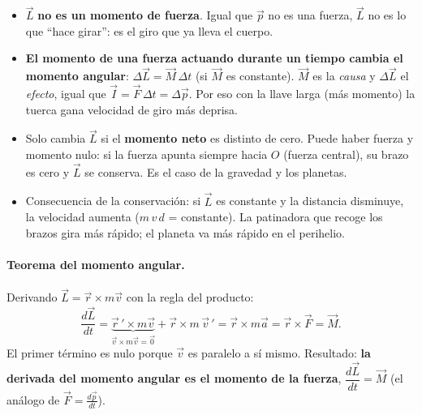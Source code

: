 \documentclass[11pt,a4paper]{article}
\begin{document}
\begin{clave}[title={Interpretación del momento angular (en paralelo con el momento lineal)}]
\begin{center}
\end{center}
\begin{itemize}[itemsep=2pt]
  \item $\vec L$ \textbf{no es un momento de fuerza}. Igual que $\vec p$ no es una fuerza, $\vec L$ no es lo que ``hace girar'': es el giro que ya lleva el cuerpo.
  \item \textbf{El momento de una fuerza actuando durante un tiempo cambia el momento angular}: $\Delta\vec L=\vec M\,\Delta t$ (si $\vec M$ es constante). $\vec M$ es la \emph{causa} y $\Delta\vec L$ el \emph{efecto}, igual que $\vec I=\vec F\,\Delta t=\Delta\vec p$. Por eso con la llave larga (más momento) la tuerca gana velocidad de giro más deprisa.
  \item Solo cambia $\vec L$ si el \textbf{momento neto} es distinto de cero. Puede haber fuerza y momento nulo: si la fuerza apunta siempre hacia $O$ (fuerza central), su brazo es cero y $\vec L$ se conserva. Es el caso de la gravedad y los planetas.
  \item Consecuencia de la conservación: si $\vec L$ es constante y la distancia disminuye, la velocidad aumenta ($m\,v\,d$ = constante). La patinadora que recoge los brazos gira más rápido; el planeta va más rápido en el perihelio.
\end{itemize}
\end{clave}

\paragraph{Teorema del momento angular.} Derivando $\vec L=\vec r\times m\vec v$ con la regla del producto:
\[
\frac{d\vec L}{dt}=\underbrace{\vec r\,'\times m\vec v}_{\vec v\times m\vec v=\vec 0}+\vec r\times m\,\vec v\,'=\vec r\times m\vec a=\vec r\times\vec F=\vec M .
\]
El primer término es nulo porque $\vec v$ es paralelo a sí mismo. Resultado: \textbf{la derivada del momento angular es el momento de la fuerza}, $\dfrac{d\vec L}{dt}=\vec M$ (el análogo de $\vec F=\frac{d\vec p}{dt}$).
\end{document}
